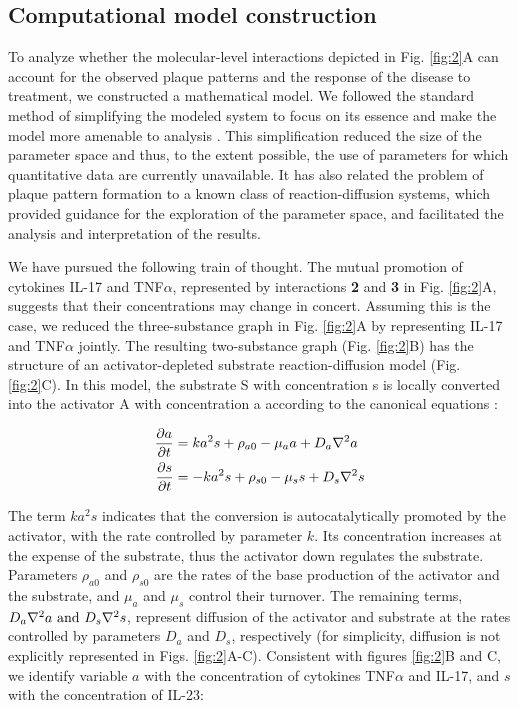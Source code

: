 \subsection{Computational model construction}
To analyze whether the molecular-level interactions depicted in Fig. \ref{fig:2}A can account for the observed plaque patterns and the response of the disease to treatment, we constructed a mathematical model. We followed the standard method of simplifying the modeled system to focus on its essence and make the model more amenable to analysis \citep{bak1996, gaines1977, prusinkiewicz1998}. This simplification reduced the size of the parameter space and thus, to the extent possible, the use of parameters for which quantitative data are currently unavailable. It has also related the problem of plaque pattern formation to a known class of reaction-diffusion systems, which provided guidance for the exploration of the parameter space, and facilitated the analysis and interpretation of the results.
 
We have pursued the following train of thought. The mutual promotion of cytokines IL-17 and TNF$\alpha$, represented by interactions \textbf{2} and \textbf{3} in Fig. \ref{fig:2}A, suggests that their concentrations may change in concert. Assuming this is the case, we reduced the three-substance graph in Fig. \ref{fig:2}A by representing IL-17 and TNF$\alpha$ jointly. The resulting two-substance graph (Fig. \ref{fig:2}B) has the structure of an activator-depleted substrate reaction-diffusion model \citep{gierer1972, marcon2016}(Fig. \ref{fig:2}C). In this model, the substrate S with concentration s is locally converted into the activator A with concentration a according to the canonical equations \citep{gierer1972, meinhardt1982}:

\begin{equation}
	\begin{aligned} \label{eq:ahPsoriasis}
	\frac{\partial a}{\partial t} &= ka^2s+\rho_{a0}-\mu_a a + D_a \nabla^2 a \\
	\frac{\partial s}{\partial t} &= -ka^2s+\rho_{s0}-\mu_s s + D_s \nabla^2 s
	\end{aligned}
\end{equation}

The term $ka^2s$ indicates that the conversion is autocatalytically promoted by the activator, with the rate controlled by parameter $k$. Its concentration increases at the expense of the substrate, thus the activator down regulates the substrate. Parameters $\rho_{a0}$ and $\rho_{s0}$ are the rates of the base production of the activator and the substrate, and $\mu_a$ and $\mu_s$ control their turnover. The remaining terms, $D_a \nabla^2 a \text{ and } D_s \nabla^2 s$, represent diffusion of the activator and substrate at the rates controlled by parameters $D_a$ and $D_s$, respectively (for simplicity, diffusion is not explicitly represented in Figs. \ref{fig:2}A-C). Consistent with figures \ref{fig:2}B and C, we identify variable $a$ with the concentration of cytokines TNF$\alpha$ and IL-17, and $s$ with the concentration of IL-23:

